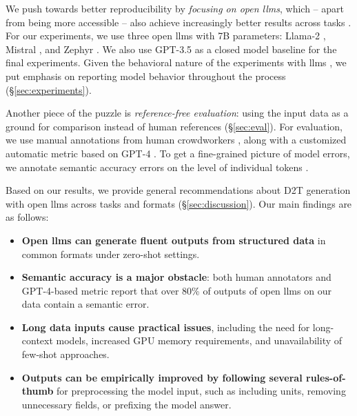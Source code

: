 We push towards better reproducibility by \textit{focusing on open \acp{llm}}, which -- apart from being more accessible -- also achieve increasingly better results across tasks \cite{zheng2023judging,open-llm-leaderboard}. For our experiments, we use three open \acp{llm} with 7B parameters: Llama-2 \cite{touvronLlamaOpenFoundation2023,llama-2-7b-32k}, Mistral \cite{jiangMistral7B2023}, and Zephyr \cite{tunstallZephyrDirectDistillation2023}. We also use GPT-3.5 \cite{chatgpt} as a closed model baseline for the final experiments. Given the behavioral nature of the experiments with \acp{llm} \cite{holtzmanGenerativeModelsComplex2023}, we put emphasis on reporting model behavior throughout the process  (§\ref{sec:experiments}).

Another piece of the puzzle is \textit{reference-free evaluation}: using the input data as a ground for comparison instead of human references (§\ref{sec:eval}).
For evaluation, we use manual annotations from human crowdworkers \cite{vanderleeHumanEvaluationAutomatically2021}, along with a customized automatic metric based on GPT-4 \cite{liuGEvalNLGEvaluation2023,chiang-lee-2023-large,kocmiGEMBAMQMDetectingTranslation2023}. To get a fine-grained picture of model errors, we annotate semantic accuracy errors on the level of individual tokens \cite{thomsonGoldStandardMethodology2020,thomson2023evaluating}.

Based on our results, we provide general recommendations about D2T generation with open \acp{llm} across tasks and formats (§\ref{sec:discussion}). Our main findings are as follows:
\begin{itemize}
    \item \textbf{Open \acp{llm} can generate fluent outputs from structured data} in common formats under zero-shot settings.
    \item \textbf{Semantic accuracy is a major obstacle}: both human annotators and GPT-4-based metric report that over 80\% of outputs of open \acp{llm} on our data contain a semantic error.
    \item \textbf{Long data inputs cause practical issues}, including the need for long-context models, increased GPU memory requirements, and unavailability of few-shot approaches.
    \item \textbf{Outputs can be empirically improved by following several rules-of-thumb} for preprocessing the model input, such as including units, removing unnecessary fields, or prefixing the model answer.
\end{itemize}


